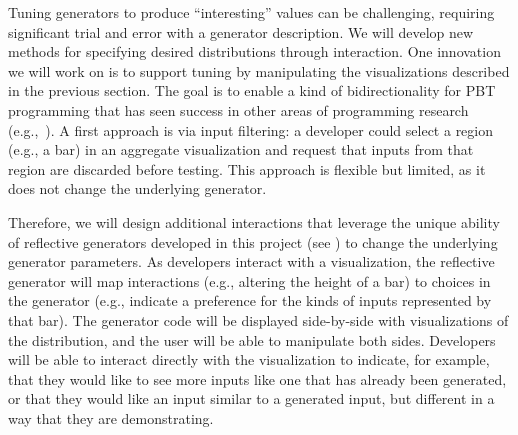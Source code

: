 {
%
Tuning generators to produce ``interesting''
values can be challenging, requiring
significant trial and error with a generator description.
We will develop new methods for specifying desired distributions through interaction. One innovation we
will work on is to support tuning by manipulating the visualizations described in the previous section. The goal is to enable a kind of
bidirectionality for PBT programming that has seen success in other areas of
programming research (e.g.,~\cite{ref:hempel2019sketch, ref:kery2020mage,
  ref:omar2012active, ref:omar2021filling}).
 A first approach is via input filtering: a developer could
select a region (e.g., a bar) in an aggregate visualization and request that
inputs from that region are discarded before testing. This approach is flexible
but limited, as it does not change the underlying generator.

Therefore, we will design additional interactions that leverage the unique
ability of reflective generators developed in this project
(see ) to change the underlying
generator parameters. As developers interact with a visualization,
the reflective generator will map interactions (e.g., altering the height of a bar)
to choices
in the generator (e.g., indicate a preference for the kinds of inputs represented by that bar).  The generator code will be displayed
side-by-side with visualizations of the distribution, and the user
will be able to manipulate both sides.
Developers will be able to interact directly with the visualization to
indicate, for example, that they would like to see more inputs like
one that has already
been generated, or that they would like an input similar to a generated input,
but different in a way that they are demonstrating.


}
